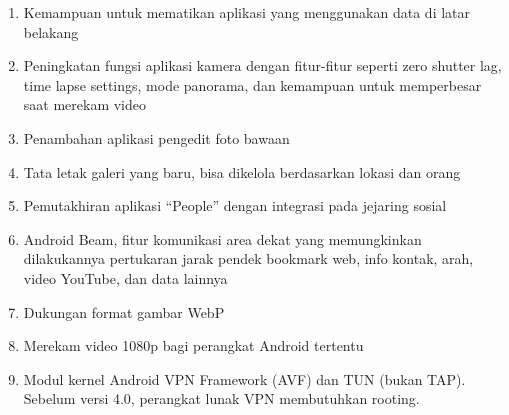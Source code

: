 \begin{enumerate}
\begin{enumerate}
    \item Kemampuan untuk mematikan aplikasi yang menggunakan data di latar belakang
    \item Peningkatan fungsi aplikasi kamera dengan fitur-fitur seperti zero shutter lag, time lapse settings, mode panorama, dan kemampuan untuk memperbesar saat merekam video
    \item Penambahan aplikasi pengedit foto bawaan
    \item Tata letak galeri yang baru, bisa dikelola berdasarkan lokasi dan orang
    \item Pemutakhiran aplikasi “People” dengan integrasi pada jejaring sosial
    \item Android Beam, fitur komunikasi area dekat yang memungkinkan dilakukannya pertukaran jarak pendek bookmark web, info kontak, arah, video YouTube, dan data lainnya
    \item Dukungan format gambar WebP
    \item Merekam video 1080p bagi perangkat Android tertentu
    \item Modul kernel Android VPN Framework (AVF) dan TUN (bukan TAP). Sebelum versi 4.0, perangkat lunak VPN membutuhkan rooting.
\end{enumerate}


\end{enumerate}

